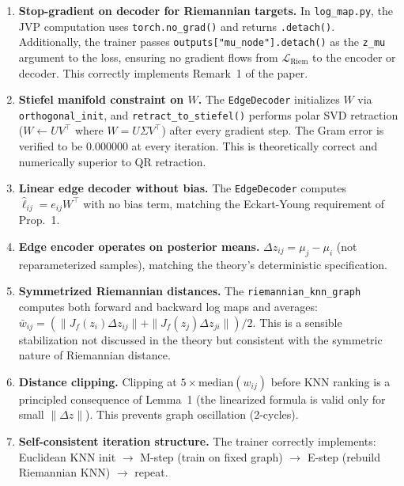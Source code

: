 \documentclass{article}
\begin{document}
\begin{enumerate}[label=\checkmark]
    \item \textbf{Stop-gradient on decoder for Riemannian targets.}
      In \texttt{log\_map.py}, the JVP computation uses
      \texttt{torch.no\_grad()} and returns \texttt{.detach()}.
      Additionally, the trainer passes \texttt{outputs["mu\_node"].detach()}
      as the \texttt{z\_mu} argument to the loss, ensuring no gradient flows
      from $\mathcal{L}_{\text{Riem}}$ to the encoder or decoder. This
      correctly implements Remark~1 of the paper.

    \item \textbf{Stiefel manifold constraint on $W$.}
      The \texttt{EdgeDecoder} initializes $W$ via \texttt{orthogonal\_init},
      and \texttt{retract\_to\_stiefel()} performs polar SVD retraction
      ($W \gets UV^\top$ where $W = U\Sigma V^\top$) after every gradient step.
      The Gram error is verified to be $0.000000$ at every iteration. This is
      theoretically correct and numerically superior to QR retraction.

    \item \textbf{Linear edge decoder without bias.}
      The \texttt{EdgeDecoder} computes $\hat{\ell}_{ij} = e_{ij} W^\top$
      with no bias term, matching the Eckart-Young requirement of Prop.~1.

    \item \textbf{Edge encoder operates on posterior means.}
      $\Delta z_{ij} = \mu_j - \mu_i$ (not reparameterized samples), matching
      the theory's deterministic specification.

    \item \textbf{Symmetrized Riemannian distances.}
      The \texttt{riemannian\_knn\_graph} computes both forward and backward
      log maps and averages: $\bar{w}_{ij} = (\|J_f(z_i)\Delta z_{ij}\| +
      \|J_f(z_j)\Delta z_{ji}\|)/2$. This is a sensible stabilization not
      discussed in the theory but consistent with the symmetric nature of
      Riemannian distance.

    \item \textbf{Distance clipping.}
      Clipping at $5 \times \text{median}(w_{ij})$ before KNN ranking is a
      principled consequence of Lemma~1 (the linearized formula is valid only
      for small $\|\Delta z\|$). This prevents graph oscillation (2-cycles).

    \item \textbf{Self-consistent iteration structure.}
      The trainer correctly implements: Euclidean KNN init $\to$ M-step
      (train on fixed graph) $\to$ E-step (rebuild Riemannian KNN) $\to$
      repeat.
\end{enumerate}
\end{document}
